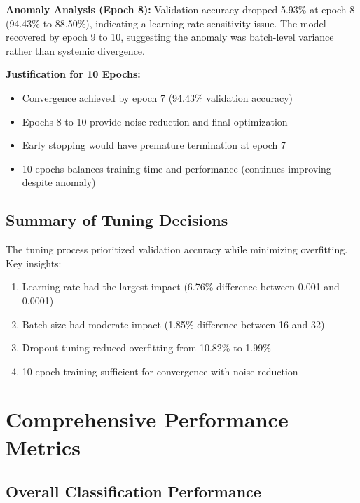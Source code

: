 \documentclass[11pt,a4paper]{article}
\begin{document}
\textbf{Anomaly Analysis (Epoch 8):} Validation accuracy dropped 5.93\% at epoch 8 (94.43\% to 88.50\%), indicating a learning rate sensitivity issue. The model recovered by epoch 9 to 10, suggesting the anomaly was batch-level variance rather than systemic divergence.

\textbf{Justification for 10 Epochs:}
\begin{itemize}
    \item Convergence achieved by epoch 7 (94.43\% validation accuracy)
    \item Epochs 8 to 10 provide noise reduction and final optimization
    \item Early stopping would have premature termination at epoch 7
    \item 10 epochs balances training time and performance (continues improving despite anomaly)
\end{itemize}

\subsection{Summary of Tuning Decisions}

The tuning process prioritized validation accuracy while minimizing overfitting. Key insights:
\begin{enumerate}
    \item Learning rate had the largest impact (6.76\% difference between 0.001 and 0.0001)
    \item Batch size had moderate impact (1.85\% difference between 16 and 32)
    \item Dropout tuning reduced overfitting from 10.82\% to 1.99\%
    \item 10-epoch training sufficient for convergence with noise reduction
\end{enumerate}

\newpage

\section{Comprehensive Performance Metrics}

\subsection{Overall Classification Performance}
\end{document}
